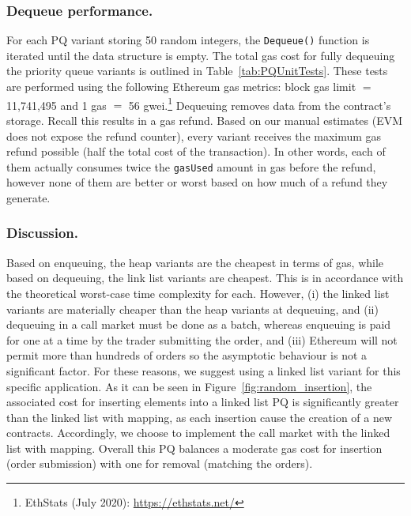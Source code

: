 




\subsubsection{Dequeue performance.} For each PQ variant storing 50 random integers, the \texttt{Dequeue()} function is iterated until the data structure is empty. The total gas cost for fully dequeuing the priority queue variants is outlined in Table~\ref{tab:PQUnitTests}. These tests are performed using the following Ethereum gas metrics: block gas limit $=$11,741,495 and 1 gas $=$ 56 gwei.\footnote{EthStats (July 2020): \url{https://ethstats.net/}} Dequeuing removes data from the contract's storage. Recall this results in a gas refund. Based on our manual estimates (EVM does not expose the refund counter), every variant receives the maximum gas refund possible (\ie half the total cost of the transaction). In other words, each of them actually consumes twice the \texttt{gasUsed} amount in gas before the refund, however none of them are better or worst based on how much of a refund they generate.  

\subsubsection{Discussion.} Based on enqueuing, the heap variants are the cheapest in terms of gas, while based on dequeuing, the link list variants are cheapest. This is in accordance with the theoretical worst-case time complexity for each. However, (i) the linked list variants are materially cheaper than the heap variants at dequeuing, and (ii) dequeuing in a call market must be done as a batch, whereas enqueuing is paid for one at a time by the trader submitting the order, and (iii) Ethereum will not permit more than hundreds of orders so the asymptotic behaviour is not a significant factor. For these reasons, we suggest using a linked list variant for this specific application. As it can be seen in Figure~\ref{fig:random_insertion}, the associated cost for inserting elements into a linked list PQ is significantly greater than the linked list with mapping, as each insertion cause the creation of a new contracts. Accordingly, we choose to implement the call market with the linked list with mapping. Overall this PQ balances a moderate gas cost for insertion (\ie order submission) with one for removal (\ie matching the orders). 

